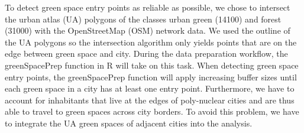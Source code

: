 \documentclass[10pt]{article}
\begin{document}
To detect green space entry points as reliable as possible, we chose to intersect the urban atlas (UA) polygons of the classes urban green (14100) and forest (31000) with the OpenStreetMap (OSM) network data.
We used the outline of the UA polygons so the intersection algorithm only yields points that are on the edge between green space and city.
During the data preparation workflow, the greenSpacePrep function in R will take on this task.
When detecting green space entry points, the greenSpacePrep function will apply increasing buffer sizes until each green space in a city has at least one entry point.  
Furthermore, we have to account for inhabitants that live at the edges of poly-nuclear cities and are thus able to travel to green spaces across city borders.
To avoid this problem, we have to integrate the UA green spaces of adjacent cities into the analysis.
\end{document}
